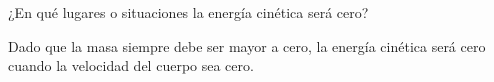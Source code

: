 ¿En qué lugares o situaciones la energía cinética será cero?


\begin{solutionbox}{2cm}
    Dado que la masa siempre debe ser mayor a cero, la energía cinética será
    cero cuando la velocidad del cuerpo sea cero.
\end{solutionbox}
